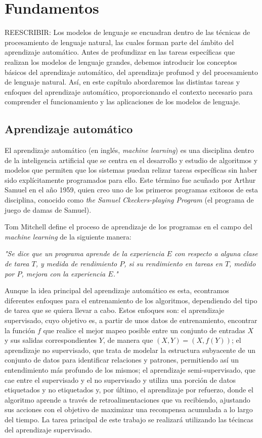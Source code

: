 \documentclass[11pt,spanish,listoffigures,listoftables]{tfgetsinf}
\begin{document}
\chapter{Fundamentos}\label{capitulo:fundamentos}

REESCRIBIR: Los modelos de lenguaje se encuadran dentro de las técnicas de procesamiento de lenguaje natural, las cuales forman parte del ámbito del aprendizaje automático. Antes de profundizar en las tareas específicas que realizan los modelos de lenguaje grandes, debemos introducir los conceptos básicos del aprendizaje automático, del aprendizaje profunod y del procesamiento de lenguaje natural. Así, en este capítulo abordaremos las distintas tareas y enfoques del aprendizaje automático, proporcionando el contexto necesario para comprender el funcionamiento y las aplicaciones de los modelos de lenguaje.

\section{Aprendizaje automático}

El aprendizaje automático (en inglés, \textit{machine learning}) es una disciplina dentro de la inteligencia artificial que se centra en el desarrollo y estudio de algoritmos y modelos que permiten que los sistemas puedan relizar tareas específicas sin haber sido explícitamente programados para ello. Este término fue acuñado por Arthur Samuel en el año 1959, quien creo uno de los primeros programas exitosos de esta disciplina, conocido como \textit{the Samuel Ckeckers-playing Program} \cite{samuelCheckers} (el programa de juego de damas de Samuel).

Tom Mitchell \cite{mitchell1997mcgraw} define el proceso de aprendizaje de los programas en el campo del \textit{machine learning} de la siguiente manera:

\textit{"Se dice que un programa aprende de la experiencia $E$ con respecto a alguna clase de tarea $T$, y medida de rendimiento $P$, si su rendimiento en tareas en $T$, medido por $P$, mejora con la experiencia $E$."}

Aunque la idea principal del aprendizaje automático es esta, econtramos diferentes enfoques para el entrenamiento de los algoritmos, dependiendo del tipo de tarea que se quiera llevar a cabo. Estos enfoques son: el aprendizaje supervisado, cuyo objetivo es, a partir de unos datos de entrenamiento, encontrar la función $f$ que realice el mejor mapeo posible entre un conjunto de entradas $X$ y sus salidas correspondientes $Y$, de manera que $(X, Y) = (X, f(Y))$; el aprendizaje no supervisado, que trata de modelar la estructura subyacente de un conjunto de datos para identificar relaciones y patrones, permitiendo así un entendimiento más profundo de los mismos; el aprendizaje semi-supervisado, que cae entre el supervisado y el no supervisado y utiliza una porción de datos etiquetados y no etiquetados y, por último, el aprendizaje por refuerzo, donde el algoritmo aprende a través de retroalimentaciones que va recibiendo, ajustando sus acciones con el objetivo de maximizar una recompensa acumulada a lo largo del tiempo. La tarea principal de este trabajo se realizará utilizando las técincas del aprendizaje supervisado.
\end{document}
